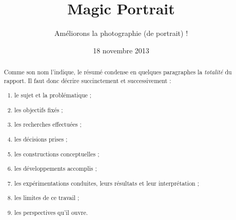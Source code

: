\documentclass[11pt, french]{report-rd-info}
\begin{document}
\title{Magic Portrait}
\subtitle{Améliorons la photographie (de portrait) !}
\date{18 novembre 2013}


\begin{abstract}
Comme son nom l'indique, le résumé condense en quelques paragraphes
la \emph{totalité} du rapport. Il faut donc décrire succinctement et
successivement :
\begin{enumerate}
   \item le sujet et la problématique ;
   \item les objectifs fixés ;
   \item les recherches effectuées ;
   \item les décisions prises ;
   \item les constructions conceptuelles ;
   \item les développements accomplis ;
   \item les expérimentations conduites, leurs résultats et leur interprétation ;
   \item les limites de ce travail ;
   \item les perspectives qu'il ouvre.
\end{enumerate}
\end{abstract}
\end{document}
